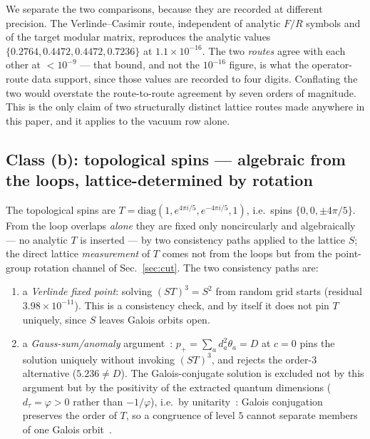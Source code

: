 \documentclass[aps,pra,twocolumn,superscriptaddress,longbibliography,floatfix,nofootinbib]{revtex4-2}
\begin{document}
We separate the two comparisons, because they are recorded at different
precision. The Verlinde--Casimir route, independent of analytic $F/R$ symbols
and of the target modular matrix, reproduces the analytic
values $\{0.2764,0.4472,0.4472,0.7236\}$ at $1.1\times10^{-16}$. The two
\emph{routes} agree with each other at $<10^{-9}$ --- that bound, and not the
$10^{-16}$ figure, is what the operator-route data support, since those values
are recorded to four digits. Conflating the two would overstate the
route-to-route agreement by seven orders of magnitude. This is the only claim
of two structurally distinct lattice routes made anywhere in this paper, and it
applies to the vacuum row alone.

\subsection{Class (b): topological spins --- algebraic from the loops,
lattice-determined by rotation}
\label{sec:classb}

The topological spins are
$T=\mathrm{diag}(1,e^{4\pi i/5},e^{-4\pi i/5},1)$, i.e.\ spins
$\{0,0,\pm4\pi/5\}$. From the loop overlaps \emph{alone} they are fixed only
noncircularly and algebraically --- no analytic $T$ is inserted --- by two
consistency paths applied to the lattice $S$; the direct lattice
\emph{measurement} of $T$ comes not from the loops but from the point-group
rotation channel of Sec.~\ref{sec:cut}. The two consistency paths are:

\begin{enumerate}
\item[(b1)] a \emph{Verlinde fixed point}: solving $(ST)^{3}=S^{2}$ from random
grid starts (residual $3.98\times10^{-11}$). This is a consistency check, and
by itself it does not pin $T$ uniquely, since $S$ leaves Galois orbits open.
\item[(b2)] a \emph{Gauss-sum/anomaly} argument~\cite{Vafa1988,Bantay1997}:
$p_{+}=\sum_a d_a^{2}\theta_a = D$ at $c=0$ pins the solution uniquely without
invoking $(ST)^{3}$, and rejects the order-3 alternative ($5.236 \ne D$). The
Galois-conjugate solution is excluded not by this argument but by the
positivity of the extracted quantum dimensions ($d_{\tau}=\varphi>0$ rather
than $-1/\varphi$), i.e.\ by unitarity~\cite{Freedman2012}: Galois conjugation
preserves the order of $T$, so a congruence of level $5$ cannot separate
members of one Galois orbit~\cite{NgSchauenburg2010,DongLinNg2015}.
\end{enumerate}
\end{document}
